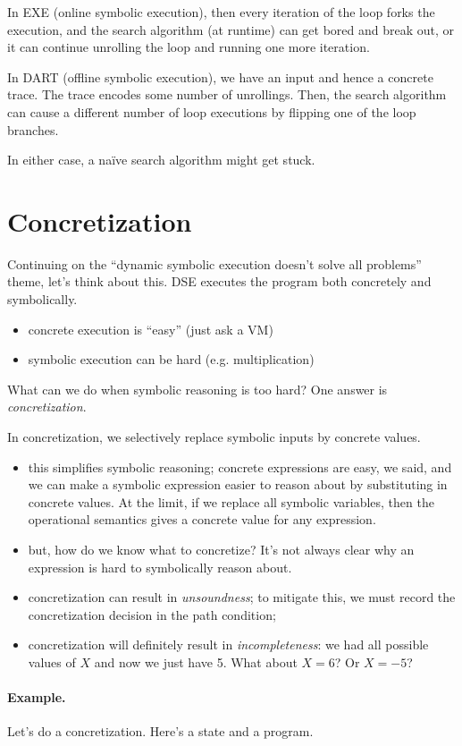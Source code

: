 \documentclass[11pt]{article}
\begin{document}
In EXE (online symbolic execution), then every iteration of the loop forks the execution, and the search algorithm (at runtime) can get bored and
break out, or it can continue unrolling the loop and running one more iteration.

In DART (offline symbolic execution), we have an input and hence a concrete trace. The trace encodes some number of unrollings. Then, the search algorithm
can cause a different number of loop executions by flipping one of the loop branches.

In either case, a na\"ive search algorithm might get stuck.

\section{Concretization}
Continuing on the ``dynamic symbolic execution doesn't solve all problems'' theme, let's think about this. DSE executes the program both concretely and symbolically.
\begin{itemize}[noitemsep]
\item concrete execution is ``easy'' (just ask a VM)
\item symbolic execution can be hard (e.g. multiplication)
\end{itemize}
What can we do when symbolic reasoning is too hard? One answer is \emph{concretization}.

In concretization, we selectively replace symbolic inputs by concrete values.
\begin{itemize}[noitemsep]
\item this simplifies symbolic reasoning; concrete expressions are easy, we said, and we can make a symbolic expression easier to reason about by substituting in concrete values. At the limit, if we replace all symbolic variables, then the operational semantics gives a concrete value for any expression.
\item but, how do we know what to concretize? It's not always clear why an expression is hard to symbolically reason about.
\item concretization can result in \emph{unsoundness}; to mitigate this, we must record the concretization decision in the path condition;
\item concretization will definitely result in \emph{incompleteness}: we had all possible values of $X$ and now we just have 5. What about $X = 6$? Or $X=-5$?
\end{itemize}

\paragraph{Example.} Let's do a concretization. Here's a state and a program.
\end{document}
